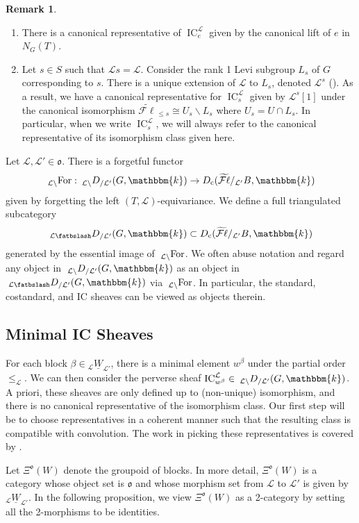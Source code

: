 \documentclass{amsart}
\renewcommand{\k}{\mathbbm{k}}
\newcommand{\scrL}{\mathcal{L}}
\DeclareMathOperator{\cons}{c}
\DeclareMathOperator{\IC}{IC}
\newcommand{\fr}[1]{\mathfrak{#1}}
\newcommand{\eFl}{\widetilde{\mathcal{F}\ell}}
\newcommand{\DME}[2]{\:_{#1 \smallleftdash} D_{/ #2} }
\newcommand{\DEE}[2]{\:_{#1 \backslash} D_{/ #2} }
\newcommand{\ForME}[1]{\:_{#1 \backslash} \textnormal{For}}
\newcommand{\uW}[2]{{}_{#1}\underline{W}_{#2}}
\newcommand{\bfslash}{\mathbin{\fatbslash}}
\newcommand*\smallleftdash{\bfslash}
\theoremstyle{definition}
\newtheorem{remark}[subsubsection]{Remark}
\numberwithin{equation}{subsection}
\begin{document}
\begin{remark}
  \begin{enumerate}
    \item There is a canonical representative of $\IC_e^{\scrL}$ given by the canonical lift of $e$ in $N_G (T)$.
  
    \item Let $s \in S$ such that $\scrL s = \scrL$.
    Consider the rank 1 Levi subgroup $L_s$ of $G$ corresponding to $s$.
    There is a unique extension of $\scrL$ to $L_s$, denoted $\scrL^s$ (\cite[Lemma 3.2.4]{Sandvik}).
    As a result, we have a canonical representative for $\IC_s^{\scrL}$ given by $\scrL^s [1]$ under the canonical isomorphism $\eFl_{\leq s} \cong U_s \backslash L_s$ where $U_s = U \cap L_s$.
    In particular, when we write $\IC_s^{\scrL}$, we will always refer to the canonical representative of its isomorphism class given here.
  \end{enumerate}
\end{remark}

Let $\scrL, \scrL' \in \fr{o}$. There is a forgetful functor
\[\ForME{\scrL} : \DEE{\scrL}{\scrL'} (G, \k) \to D_{\cons} (\eFl /_{\scrL'} B, \k)\]
given by forgetting the left $(T, \scrL)$-equivariance.
We define a full triangulated subcategory
\[\DME{\scrL}{\scrL'} (G, \k) \subset D_{\cons} (\eFl /_{\scrL'} B, \k)\]
generated by the essential image of $\ForME{\scrL}$. 
We often abuse notation and regard any object in $\DEE{\scrL}{\scrL'} (G, \k)$ as an object in $\DME{\scrL}{\scrL'} (G, \k)$ via $\ForME{\scrL}$. 
In particular, the standard, costandard, and IC sheaves can be viewed as objects therein.

\subsection{Minimal IC Sheaves}\label{subsec:min_IC}

For each block $\beta \in \uW{\scrL}{\scrL'}$, there is a minimal element $w^{\beta}$ under the partial order $\leq_{\scrL}$.
We can then consider the perverse sheaf $\IC_{w^{\beta}}^{\scrL} \in \DEE{\scrL}{\scrL'} (G, \k)$. 
A priori, these sheaves are only defined up to (non-unique) isomorphism, and there is no canonical representative of the isomorphism class.
Our first step will be to choose representatives in a coherent manner such that the resulting class is compatible with convolution.
The work in picking these representatives is covered by \cite[\S 5.8]{Sandvik}.

Let $\Xi^{\fr{o}} (W)$ denote the groupoid of blocks. In more detail, $\Xi^{\fr{o}} (W)$ is a category whose object set is $\fr{o}$ and whose morphism set from $\scrL$ to $\scrL'$ is given by $\uW{\scrL}{\scrL'}$.
In the following proposition, we view $\Xi^{\fr{o}} (W)$ as a 2-category by setting all the 2-morphisms to be identities.
\end{document}
